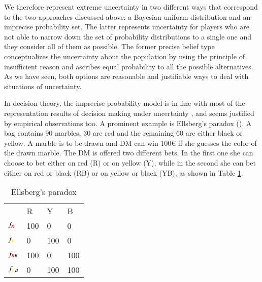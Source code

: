 \documentclass[fleqn,reqno,11pt]{article}
\begin{document}
We therefore represent extreme uncertainty in two different ways that correspond to the two
approaches discussed above: a Bayesian uniform distribution and an imprecise probability
set. The latter represents uncertainty for players who are not able to narrow down the set of
probability distributions to a single one and they consider all of them as possible. The former
precise belief type conceptualizes the uncertainty about the population by using the principle
of insufficient reason and ascribes equal probability to all the possible alternatives. As we
have seen, both options are reasonable and justifiable ways to deal with situations of
uncertainty.

In decision theory, the imprecise probability model is in line with most of the representation
results of decision making under uncertainty \citep[e.g.,][]{gilsch89,KlibMarMuk05,GhirMar02},
and seems justified by empirical observations too. A prominent example is Ellsberg's paradox
(\citet{ells61}). A bag contains 90 marbles, 30 are red and the remaining 60 are either black
or yellow. A marble is to be drawn and DM can win 100€ if she guesses the color of the drawn
marble. The DM is offered two different bets. In the first one she can choose to bet either on
red (R) or on yellow (Y), while in the second she can bet either on red or black (RB) or on
yellow or black (YB), as shown in Table \ref{Ellsberg}.



\begin{table}[h]
\centering
\begin{tabular}{@{}llll@{}}
\cmidrule(l){2-4}
\multicolumn{1}{c}{} & {\color{red}R}   & {\color{yellow}Y}   & B   \\ \cmidrule(l){2-4} 
$f_{{\color{red}R}}$              & 100 & 0   & 0   \\
$f_{{\color{yellow}Y}}$              & 0   & 100 & 0   \\
$f_{{\color{red}R}B}$            & 100 & 0   & 100 \\
$f_{{\color{yellow}Y}B}$             & 0   & 100 & 100 \\ \bottomrule
\end{tabular}
\caption{Ellsberg's paradox}
\label{Ellsberg}
\end{table}
\end{document}
